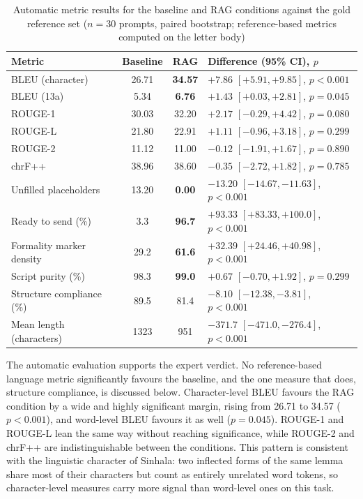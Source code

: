 \documentclass[12pt]{uomthesis}
\begin{document}
\begin{table}[!htbp]
\centering
\small
\begin{tabularx}{\linewidth}{@{}lccX@{}}
\toprule
\textbf{Metric} & \textbf{Baseline} & \textbf{RAG} & \textbf{Difference (95\% CI), $p$} \\
\midrule
BLEU (character) & 26.71 & \textbf{34.57} & $+7.86$ $[+5.91, +9.85]$, $p < 0.001$ \\
BLEU (13a) & 5.34 & \textbf{6.76} & $+1.43$ $[+0.03, +2.81]$, $p = 0.045$ \\
ROUGE-1 & 30.03 & 32.20 & $+2.17$ $[-0.29, +4.42]$, $p = 0.080$ \\
ROUGE-L & 21.80 & 22.91 & $+1.11$ $[-0.96, +3.18]$, $p = 0.299$ \\
ROUGE-2 & 11.12 & 11.00 & $-0.12$ $[-1.91, +1.67]$, $p = 0.890$ \\
chrF++ & 38.96 & 38.60 & $-0.35$ $[-2.72, +1.82]$, $p = 0.785$ \\
\midrule
Unfilled placeholders & 13.20 & \textbf{0.00} & $-13.20$ $[-14.67, -11.63]$, $p < 0.001$ \\
Ready to send (\%) & 3.3 & \textbf{96.7} & $+93.33$ $[+83.33, +100.0]$, $p < 0.001$ \\
Formality marker density & 29.2 & \textbf{61.6} & $+32.39$ $[+24.46, +40.98]$, $p < 0.001$ \\
Script purity (\%) & 98.3 & \textbf{99.0} & $+0.67$ $[-0.70, +1.92]$, $p = 0.299$ \\
Structure compliance (\%) & 89.5 & 81.4 & $-8.10$ $[-12.38, -3.81]$, $p < 0.001$ \\
Mean length (characters) & 1323 & 951 & $-371.7$ $[-471.0, -276.4]$, $p < 0.001$ \\
\bottomrule
\end{tabularx}
\caption{Automatic metric results for the baseline and RAG conditions against the gold reference set ($n = 30$ prompts, paired bootstrap; reference-based metrics computed on the letter body)}
\label{tab:automatic_metrics}
\end{table}

The automatic evaluation supports the expert verdict. No reference-based language metric significantly favours the baseline, and the one measure that does, structure compliance, is discussed below. Character-level BLEU favours the RAG condition by a wide and highly significant margin, rising from 26.71 to 34.57 ($p < 0.001$), and word-level BLEU favours it as well ($p = 0.045$). ROUGE-1 and ROUGE-L lean the same way without reaching significance, while ROUGE-2 and chrF++ are indistinguishable between the conditions. This pattern is consistent with the linguistic character of Sinhala: two inflected forms of the same lemma share most of their characters but count as entirely unrelated word tokens, so character-level measures carry more signal than word-level ones on this task.
\end{document}
